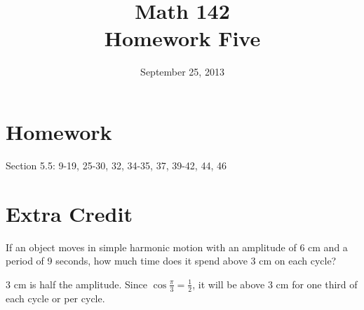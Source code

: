 \documentclass{exam}
\author{}
\date{September 25, 2013}
\title{Math 142 \\ Homework Five}
\begin{document}
  \maketitle

  \section{Homework}
  Section 5.5: 9-19, 25-30, 32, 34-35, 37, 39-42, 44, 46

  \section{Extra Credit}
  If an object moves in simple harmonic motion with an amplitude of 6 cm and a period of 9 seconds, how much time does
  it spend above 3 cm on each cycle?

  \begin{solution}
    3 cm is half the amplitude.  Since $\cos \frac{\pi}{3} = \frac{1}{2}$, it will be above 3 cm for one third of each
      cycle or  per cycle.
  \end{solution}

  \ifprintanswers
\end{document}
